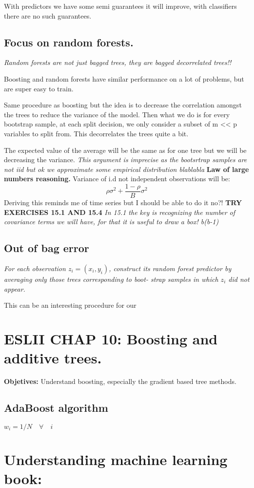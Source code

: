 \documentclass{article}
\begin{document}
With predictors we have some semi guarantees it will improve, with classifiers there are no such guarantees.

\subsection{Focus on random forests.}
\textit{Random forests are not just bagged trees, they are bagged decorrelated trees!!}

Boosting and random forests have similar performance on a lot of problems, but are super easy to train.

Same procedure as boosting but the idea is to decrease the correlation amongst the trees to reduce the variance of the model.
Then what we do is for every bootstrap sample, at each split decision, we only consider a subset of m << p variables to split from. This decorrelates the trees quite a bit.

The expected value of the average will be the same as for one tree but we will be decreasing the variance. \textit{This argument is imprecise as the bootsrtrap samples are not iid but ok we approximate some empirical distribution blablabla} \textbf{Law of large numbers reasoning.}
Variance of i.d not independent observations will be:
$$\rho \sigma^2 + \frac{1-\rho}{B}\sigma^2$$
Deriving this reminds me of time series but I should be able to do it no?!
\textbf{TRY EXERCISES 15.1 AND 15.4}
\textit{In 15.1 the key is recognizing the number of covariance terms we will have, for that it is useful to draw a box! b(b-1)}

\subsection{Out of bag error}
\textit{For each observation $z_i = (x_i, y_i)$, construct its random forest
predictor by averaging only those trees corresponding to boot-
strap samples in which $z_i$ did not appear.}

This can be an interesting procedure for our 

\section{ESLII CHAP 10: Boosting and additive trees.}

\textbf{Objetives:} Understand boosting, especially the gradient based tree methods.

\subsection{AdaBoost algorithm}

\begin{algorithmic}
    \State $w_i = 1/N \quad \forall \quad i$

\end{algorithmic}
    







\section{Understanding machine learning book:}
\end{document}

